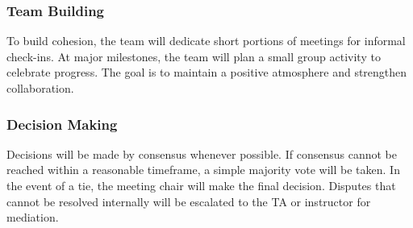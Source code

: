 \documentclass{article}
\begin{document}
\subsubsection*{Team Building}

To build cohesion, the team will dedicate short portions of meetings for informal check-ins. 
At major milestones, the team will plan a small group activity to celebrate progress. 
The goal is to maintain a positive atmosphere and strengthen collaboration.

\subsubsection*{Decision Making} 

Decisions will be made by consensus whenever possible. If consensus cannot be reached within 
a reasonable timeframe, a simple majority vote will be taken. In the event of a tie, the meeting chair 
will make the final decision. Disputes that cannot be resolved internally will be escalated to the TA 
or instructor for mediation.
\end{document}
